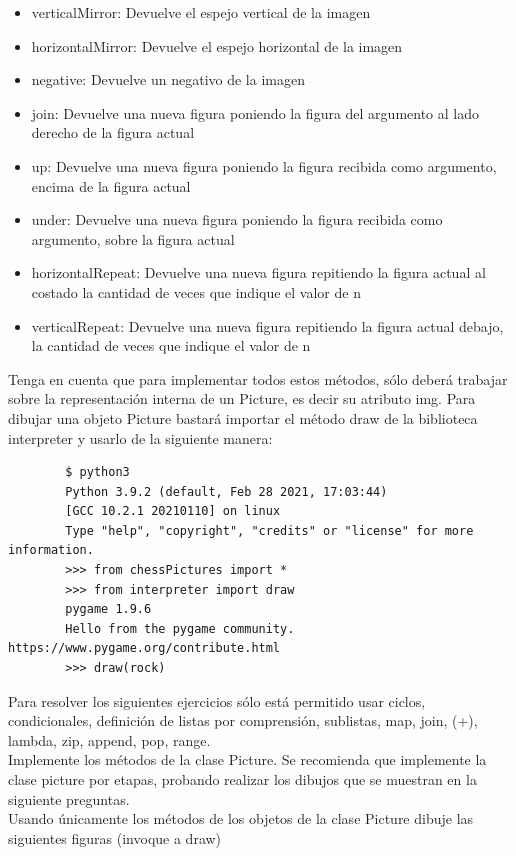 \documentclass{article}
\begin{document}
	\begin{itemize}
		\item verticalMirror: Devuelve el espejo vertical de la imagen
		\item horizontalMirror: Devuelve el espejo horizontal de la imagen
		\item negative: Devuelve un negativo de la imagen
		\item join: Devuelve una nueva figura poniendo la figura del argumento al lado derecho de la figura actual
		\item up: Devuelve una nueva figura poniendo la figura recibida como argumento, encima de la figura actual
		\item under: Devuelve una nueva figura poniendo la figura recibida como argumento, sobre la figura actual
		\item horizontalRepeat: Devuelve una nueva figura repitiendo la figura actual al costado la cantidad de veces que indique el valor de n
		\item verticalRepeat: Devuelve una nueva figura repitiendo la figura actual debajo, la cantidad de veces que indique el valor de n
	\end{itemize}
	
	Tenga en cuenta que para implementar todos estos métodos, sólo deberá trabajar sobre la representación interna de un Picture, es decir su atributo img.
	Para dibujar una objeto Picture bastará importar el método draw de la biblioteca interpreter y usarlo de la siguiente manera:
	
	\begin{lstlisting}
		$ python3
		Python 3.9.2 (default, Feb 28 2021, 17:03:44)
		[GCC 10.2.1 20210110] on linux
		Type "help", "copyright", "credits" or "license" for more information.
		>>> from chessPictures import *
		>>> from interpreter import draw
		pygame 1.9.6
		Hello from the pygame community. https://www.pygame.org/contribute.html
		>>> draw(rock)
	\end{lstlisting}
	
	Para resolver los siguientes ejercicios sólo está permitido usar ciclos, condicionales, definición de listas por comprensión, sublistas, map, join, (+), lambda, zip, append, pop, range.\\
	Implemente los métodos de la clase Picture. Se recomienda que implemente la clase picture por etapas, probando realizar los dibujos que se muestran en la siguiente preguntas.\\
	Usando únicamente los métodos de los objetos de la clase Picture dibuje las siguientes figuras (invoque a draw)
	
\end{document}

